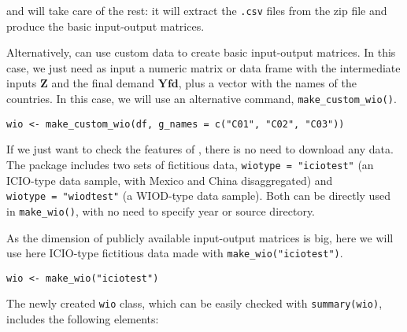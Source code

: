 and  will take care of the rest: it will extract the
\texttt{.csv} files from the zip file and produce the basic input-output matrices.

Alternatively,  can use custom data to create basic
input-output matrices. In this case, we just need as input a numeric matrix or
data frame with the intermediate inputs \(\mathbf{Z}\) and the final demand
\(\mathbf{Yfd}\), plus a vector with the names of the countries. In this case, we
will use an alternative command, \texttt{make\_custom\_wio()}.

\begin{verbatim}
wio <- make_custom_wio(df, g_names = c("C01", "C02", "C03"))
\end{verbatim}

If we just want to check the features of , there is no need
to download any data. The package includes two sets of fictitious data,
\texttt{wiotype\ =\ "iciotest"} (an ICIO-type data sample, with Mexico and China
disaggregated) and \texttt{wiotype\ =\ "wiodtest"} (a WIOD-type data sample). Both can
be directly used in \texttt{make\_wio()}, with no need to specify year or source
directory.

As the dimension of publicly available input-output matrices is big,
here we will use here ICIO-type fictitious data made with
\texttt{make\_wio("iciotest")}.

\begin{verbatim}
wio <- make_wio("iciotest")
\end{verbatim}

The newly created \texttt{wio} class, which can be easily checked with \texttt{summary(wio)},
includes the following elements:

